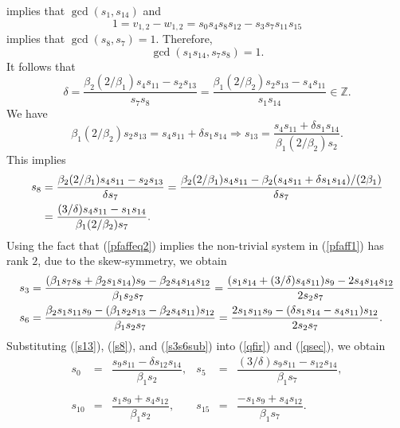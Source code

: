 \documentclass[letterpaper,10pt]{amsart}
\newcommand{\bZ}{{\mathbb{Z}}}
\theoremstyle{definition}
\numberwithin{equation}{section}
\begin{document}
implies that $\gcd(s_1, s_{14})$ and 
\[1 = v_{1,2} - w_{1,2} = s_0 s_4 s_8 s_{12} - s_3 s_7 s_{11} s_{15} \]
implies that $\gcd(s_8, s_7) = 1$. Therefore, 
\begin{equation} \label{gcd1} \gcd(s_1 s_{14}, s_7 s_8) = 1.\end{equation}
It follows that 
\begin{equation} \label{4bcalc} \delta = \frac{\beta_2 (2/\beta_1) s_4 s_{11} - s_2 s_{13} }{s_7 s_8} = \frac{\beta_1 (2/\beta_2) s_2 s_{13} - s_4 s_{11} }{s_1 s_{14}} \in \bZ.\end{equation} 
We have
\begin{equation} \label{s13} \beta_1 (2/\beta_2) s_2 s_{13} = s_4 s_{11} + \delta s_1 s_{14} \Rightarrow s_{13} =  \frac{s_4  s_{11} + \delta s_1 s_{14}}{ \beta_1 (2/\beta_2) s_2}.\end{equation}
This implies 
\begin{align} \label{s8} s_8 & = \frac{\beta_2 (2/\beta_1) s_4 s_{11} - s_2 s_{13}}{\delta s_7} = \frac{\beta_2 (2/\beta_1) s_4 s_{11} - \beta_2 (s_4 s_{11} + \delta s_1 s_{14})/(2 \beta_1)}{\delta s_7} \\
& =  \frac{   (3/\delta) s_4 s_{11} - s_1 s_{14}}{ \beta_1 (2/\beta_2)  s_7}. \notag
\end{align}
Using the fact that (\ref{pfaffeq2}) implies the non-trivial system in (\ref{pfaff1}) has rank $2$, due to the skew-symmetry, we obtain 
\begin{align} \label{s3s6sub} s_3 & = \frac{(\beta_1 s_7 s_8 + \beta_2 s_1 s_{14}) s_9 - \beta_2 s_4 s_{14} s_{12}}{\beta_1 s_2 s_7} = \frac{( s_1 s_{14} + (3/\delta) s_4 s_{11}) s_9 - 2 s_4 s_{14} s_{12}}{2 s_2 s_7} \\
s_6 & = \frac{\beta_2 s_1 s_{11} s_9 - (\beta_1 s_2 s_{13} - \beta_2 s_4 s_{11}) s_{12}}{\beta_1 s_2 s_7} = \frac{2s_1 s_{11} s_9 - (\delta s_1 s_{14} - s_4 s_{11}) s_{12} }{2 s_2 s_7}. \notag
\end{align}
Substituting  (\ref{s13}), (\ref{s8}), and (\ref{s3s6sub}) into (\ref{qfir}) and (\ref{qsec}), we obtain 
\begin{equation} \label{s0s15} \begin{matrix} s_0 & = &  \dfrac{s_9 s_{11} - \delta s_{12} s_{14}}{\beta_1 s_2}, & s_5 & = & \dfrac{(3/\delta) s_9 s_{11} - s_{12} s_{14}}{\beta_1 s_7}, \\ \\
s_{10} & = & \dfrac{s_1 s_9 + s_4 s_{12}}{\beta_1 s_2}, & s_{15} & = & \dfrac{-s_1 s_9 + s_4 s_{12}}{\beta_1 s_7}.
\end{matrix}  
\end{equation}  
\end{document}
